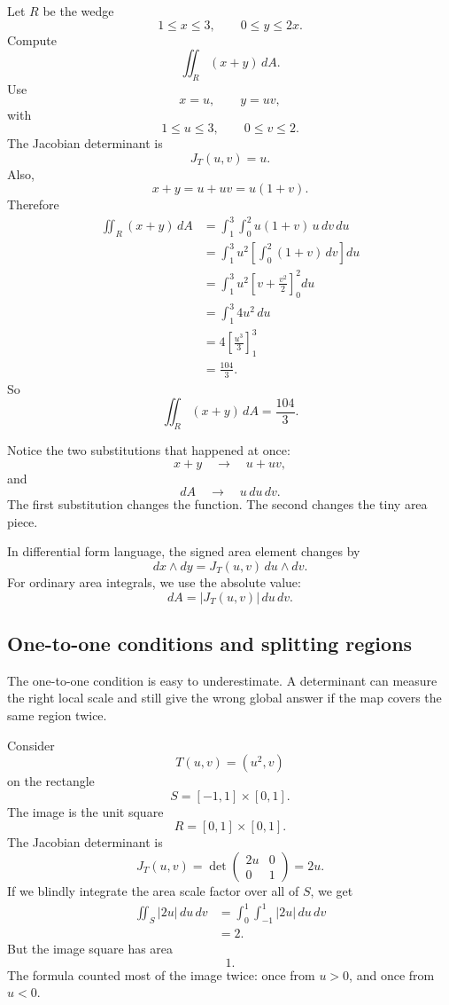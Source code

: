 Let \(R\) be the wedge
\[
    1\le x\le3,\qquad 0\le y\le2x.
\]
Compute
\[
    \iint_R (x+y)\,dA.
\]
Use
\[
    x=u,\qquad y=uv,
\]
with
\[
    1\le u\le3,\qquad 0\le v\le2.
\]
The Jacobian determinant is
\[
    J_T(u,v)=u.
\]
Also,
\[
    x+y=u+uv=u(1+v).
\]
Therefore
\[
\begin{aligned}
    \iint_R (x+y)\,dA
    &=
    \int_1^3\int_0^2 u(1+v)\,u\,dv\,du\\
    &=
    \int_1^3 u^2
    \left[\int_0^2(1+v)\,dv\right]du\\
    &=
    \int_1^3 u^2
    \left[v+\frac{v^2}{2}\right]_0^2du\\
    &=
    \int_1^3 4u^2\,du\\
    &=
    4\left[\frac{u^3}{3}\right]_1^3\\
    &=
    \frac{104}{3}.
\end{aligned}
\]
So
\[
\boxed{
    \iint_R (x+y)\,dA=\frac{104}{3}.
}
\]

Notice the two substitutions that happened at once:
\[
    x+y
    \quad\longrightarrow\quad
    u+uv,
\]
and
\[
    dA
    \quad\longrightarrow\quad
    u\,du\,dv.
\]
The first substitution changes the function.  The second changes the tiny area piece.

In differential form language, the signed area element changes by
\[
\boxed{
    dx\wedge dy
    =
    J_T(u,v)\,du\wedge dv.
}
\]
For ordinary area integrals, we use the absolute value:
\[
\boxed{
    dA=|J_T(u,v)|\,du\,dv.
}
\]

\subsection{One-to-one conditions and splitting regions}

The one-to-one condition is easy to underestimate.  A determinant can measure the
right local scale and still give the wrong global answer if the map covers the same
region twice.

Consider
\[
    T(u,v)=(u^2,v)
\]
on the rectangle
\[
    S=[-1,1]\times[0,1].
\]
The image is the unit square
\[
    R=[0,1]\times[0,1].
\]
The Jacobian determinant is
\[
    J_T(u,v)
    =
    \det
    \begin{pmatrix}
        2u&0\\
        0&1
    \end{pmatrix}
    =
    2u.
\]
If we blindly integrate the area scale factor over all of \(S\), we get
\[
\begin{aligned}
    \iint_S |2u|\,du\,dv
    &=
    \int_0^1\int_{-1}^1 |2u|\,du\,dv\\
    &=
    2.
\end{aligned}
\]
But the image square has area
\[
    1.
\]
The formula counted most of the image twice: once from \(u>0\), and once from
\(u<0\).

